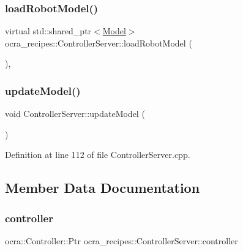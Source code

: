 \subsubsection{\texorpdfstring{load\+Robot\+Model()}{loadRobotModel()}}
{\footnotesize\ttfamily virtual std\+::shared\+\_\+ptr$<$\hyperlink{classocra_1_1Model}{Model}$>$ ocra\+\_\+recipes\+::\+Controller\+Server\+::load\+Robot\+Model (\begin{DoxyParamCaption}{ }\end{DoxyParamCaption})\hspace{0.3cm}{\ttfamily [protected]}, {}}

\hypertarget{classocra__recipes_1_1ControllerServer_a83755d02be88fa3805d770d964995fb0}{}\label{classocra__recipes_1_1ControllerServer_a83755d02be88fa3805d770d964995fb0} 
\subsubsection{\texorpdfstring{update\+Model()}{updateModel()}}
{\footnotesize\ttfamily void Controller\+Server\+::update\+Model (\begin{DoxyParamCaption}{ }\end{DoxyParamCaption})}



Definition at line 112 of file Controller\+Server.\+cpp.



\subsection{Member Data Documentation}
\hypertarget{classocra__recipes_1_1ControllerServer_a8e452bd0a8dce47b6fd289599e7ce210}{}\label{classocra__recipes_1_1ControllerServer_a8e452bd0a8dce47b6fd289599e7ce210} 
\subsubsection{\texorpdfstring{controller}{controller}}
{\footnotesize\ttfamily ocra\+::\+Controller\+::\+Ptr ocra\+\_\+recipes\+::\+Controller\+Server\+::controller\hspace{0.3cm}{\ttfamily [protected]}}



